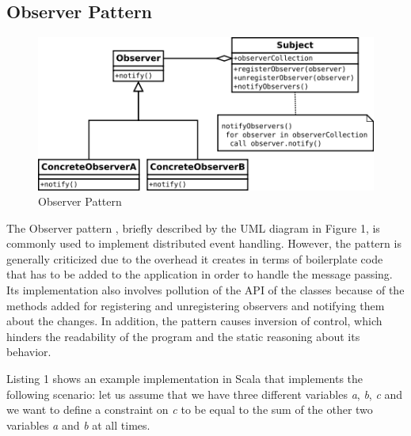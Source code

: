 \documentclass{sigplanconf}
\begin{document}
\subsection{Observer Pattern}

\begin{figure}
\centering
\includegraphics[width=\columnwidth]{observer}
\caption{Observer Pattern}
\end{figure}

The Observer pattern \cite{ojpg}, briefly described by the UML diagram in Figure 1, is commonly used to implement distributed event handling. However, the pattern is generally criticized due to the overhead it creates in terms of boilerplate code that has to be added to the application in order to handle the message passing. Its implementation also involves pollution of the API of the classes because of the methods added for registering and unregistering observers and notifying them about the changes. In addition, the pattern causes inversion of control, which hinders the readability of the program and the static reasoning about its behavior.

Listing 1 shows an example implementation in Scala that implements the following scenario: let us assume that we have three different variables  \textit{a}, \textit{b}, \textit{c} and we want to define a constraint on \textit{c} to be equal to the sum of the other two variables \textit{a} and \textit{b} at all times.

\bigskip
\end{document}
